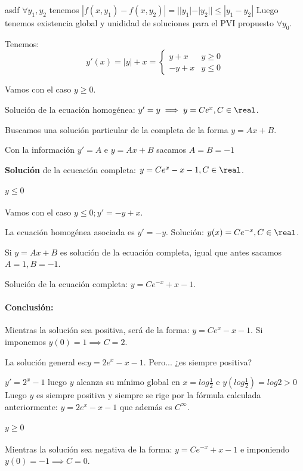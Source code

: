 \documentclass[nochap]{apuntes}
\begin{document}
\begin{problem}[12]

asdf
\solution
$\forall y_1,y_2$ tenemos $|f(x,y_1) - f(x,y_2)| = ||y_1| - |y_2|| \leq |y_1 - y_2|$
Luego tenemos existencia global y unididad de soluciones para el PVI propuesto $\forall y_0$.

Tenemos: \[y'(x) = |y| + x = \left\{\begin{array}{cc}
y+x & y \ge 0\\
-y + x & y \leq 0
\end{array}\right.\]

Vamos con el caso $y\ge 0$. 

Solución de la ecuación homogénea: $y'=y \implies y=Ce^x, C\in\real$.

Buscamos una solución particular de la completa de la forma $y=Ax+B$.

Con la información $y'=A$ e $y=Ax+B$ sacamos $A=B=-1$

\textbf{Solución} de la ecucación completa: $y = Ce^x -x-1, C\in\real$.

\paragraph{$y\leq 0$}
Vamos con el caso $y\leq 0; y'=-y+x$.

La ecuación homogénea asociada es $y'=-y$. Solución: $y(x) = Ce^{-x}, C\in\real$.

Si $y=Ax+B$ es solución de la ecuación completa, igual que antes sacamos $A=1,B=-1$.

Solución de la ecuación completa: $y = Ce^{-x} + x-1$.

\paragraph{Conclusión:} Mientras la solución sea positiva, será de la forma: $y = Ce^x -x-1$. Si imponemos $y(0)=1 \implies C=2$.

La solución general es:$y = 2e^x -x-1$. Pero... ¿es siempre positiva?  

$y'=2^x-1$ luego $y$ alcanza su mínimo global en $x=log\frac{1}{2}$ e $\displaystyle y\left(log\frac{1}{2}\right) = log 2 >0$
Luego $y$ es siempre positiva y siempre se rige por la fórmula calculada anteriormente: $y = 2e^x -x-1$ que además es $C^{\infty}$.


\paragraph{$y\ge 0$}
Mientras la solución sea negativa de la forma: $y=Ce^{-x}+x-1$ e imponiendo $y(0) = -1 \implies C=0$.


\end{problem}
\end{document}

